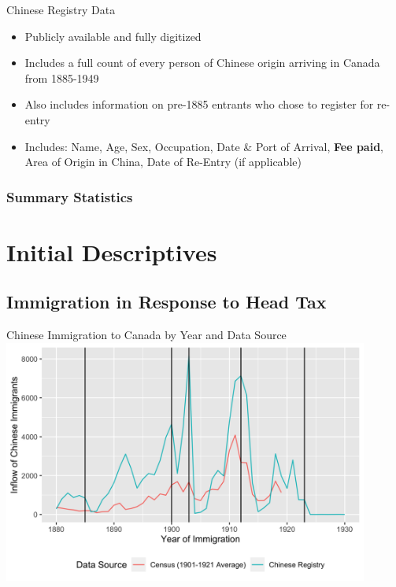 \documentclass[pdf]{beamer}
\begin{document}
\begin{frame}{Chinese Registry Data}
    \begin{itemize}
        \item Publicly available and fully digitized
        \item Includes a full count of every person of Chinese origin arriving in Canada from 1885-1949
        \item Also includes information on pre-1885 entrants who chose to register for re-entry 
        \item Includes: Name, Age, Sex, Occupation, Date \& Port of Arrival, \textbf{Fee paid}, Area of Origin in China, Date of Re-Entry (if applicable) 
    \end{itemize}
\end{frame}

\begin{frame}
	\frametitle{Summary Statistics}
	\begin{table}[H]
        \centering 
		\resizebox{\textwidth}{!}{
            
		}
	\end{table}  
\end{frame}


\section{Initial Descriptives}
\subsection{Immigration in Response to Head Tax}
\begin{frame}[label = yrimmchi]{Chinese Immigration to Canada by Year and Data Source}
    \centering
    \includegraphics[width = 0.9\textwidth]{../../figs/yrimmchi.png}
    \hyperlink{dateimmchi}{}
\end{frame}
\end{document}
